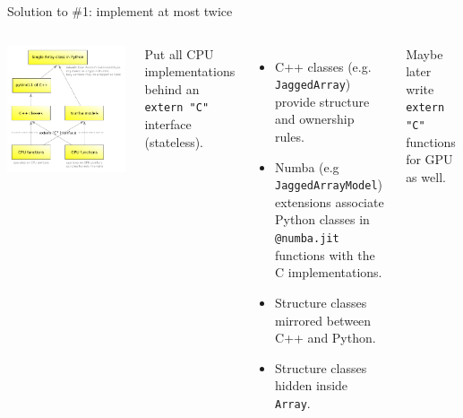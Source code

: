 \documentclass[aspectratio=169]{beamer}
\begin{document}
\begin{frame}{Solution to \#1: implement at most twice}
\vspace{0.1 cm}

\begin{columns}
\includegraphics[width=\linewidth]{awkward-1-0-layers.pdf}

Put all CPU implementations behind an \texttt{extern "C"} interface (stateless).

\begin{itemize}
\item C++ classes (e.g. {\tt JaggedArray}) provide structure and ownership rules.
\item Numba (e.g {\tt JaggedArrayModel}) extensions associate Python classes in \texttt{@numba.jit} functions with the C implementations.
\item Structure classes mirrored between C++ and Python.
\item Structure classes hidden inside {\tt Array}.
\end{itemize}

Maybe later write \texttt{extern "C"} functions for GPU as well.
\end{columns}
\end{frame}
\end{document}
